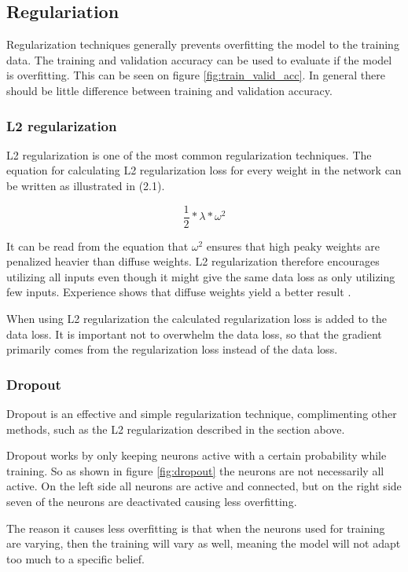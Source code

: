 \subsection{Regulariation}
Regularization techniques generally prevents overfitting the model to the training data. The training and validation accuracy can be used to evaluate if the model is overfitting. This can be seen on figure \ref{fig:train_valid_acc}. In general there should be little difference between training and validation accuracy.



\subsubsection{L2 regularization}
L2 regularization is one of the most common regularization techniques. The equation for calculating L2 regularization loss for every weight in the network can be written as illustrated in (2.1). 

\begin{equation}
\dfrac{1}{2} * \lambda * \omega^2
\end{equation}

It can be read from the equation that $\omega^2$ ensures that high peaky weights are penalized heavier than diffuse weights. L2 regularization therefore encourages utilizing all inputs even though it might give the same data loss as only utilizing few inputs. Experience shows that diffuse weights yield a better result \citep{LC_cs231n}.

When using L2 regularization the calculated regularization loss is added to the data loss. It is important not to overwhelm the data loss, so that the gradient primarily comes from the regularization loss instead of the data loss. 


\subsubsection{Dropout}
Dropout is an effective and simple regularization technique, complimenting other methods, such as the L2 regularization described in the section above. 

Dropout works by only keeping neurons active with a certain probability while training. So as shown in figure \ref{fig:dropout} the neurons are not necessarily all active. On the left side all neurons are active and connected, but on the right side seven of the neurons are deactivated causing less overfitting.  


The reason it causes less overfitting is that when the neurons used for training are varying, then the training will vary as well, meaning the model will not adapt too much to a specific belief. 








